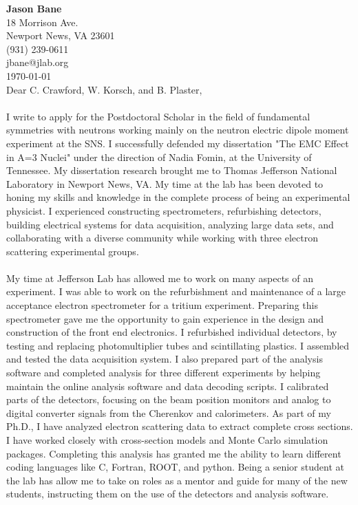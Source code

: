 \documentclass[12pt,letterpaper]{article}
\newcommand{\CPP}
{C\nolinebreak[4]\hspace{-.05em}\raisebox{.22ex}{\footnotesize\bf ++}}
\begin{document}
\vspace*{-1.2cm}
\noindent\textbf{Jason Bane}\\
18 Morrison Ave. \\
Newport News, VA 23601 \\
(931) 239-0611 \\
jbane@jlab.org \\
\today\\

Dear C. Crawford, W. Korsch, and B. Plaster,
 

\paragraph{}I write to apply for the Postdoctoral Scholar in the field of fundamental symmetries with neutrons working mainly on the neutron electric dipole moment experiment at the SNS. I successfully defended my dissertation "The EMC Effect in A=3 Nuclei" under the direction of Nadia Fomin, at the University of Tennessee. My dissertation research brought me to Thomas Jefferson National Laboratory in Newport News, VA. My time at the lab has been devoted to honing my skills and knowledge in the complete process of being an experimental physicist. I experienced constructing spectrometers, refurbishing detectors, building electrical systems for data acquisition, analyzing large data sets, and collaborating with a diverse community while working with three electron scattering experimental groups.
\paragraph{}My time at Jefferson Lab has allowed me to work on many aspects of an experiment. I was able to work on the refurbishment and maintenance of a large acceptance electron spectrometer for a tritium experiment. Preparing this spectrometer gave me the opportunity to gain experience in the design and construction of the front end electronics. I refurbished individual detectors, by testing and replacing photomultiplier tubes and scintillating plastics. I assembled and tested the data acquisition system.
I also prepared part of the analysis software and completed analysis for three different experiments by helping maintain the online analysis software and data decoding scripts. I calibrated parts of the detectors, focusing on the beam position monitors and analog to digital converter signals from the Cherenkov and calorimeters. As part of my Ph.D., I have analyzed electron scattering data to extract complete cross sections. I have worked closely with cross-section models and Monte Carlo simulation packages. Completing this analysis has granted me the ability to learn different coding languages like \CPP, Fortran, ROOT, and python. Being a senior student at the lab has allow me to take on roles as a mentor and guide for many of the new students, instructing them on the use of the detectors and analysis software.
\end{document}
